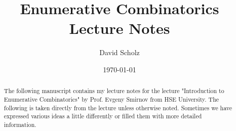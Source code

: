 \documentclass[a4paper,12pt,oneside]{article}
\title{Enumerative Combinatorics\\[0.3cm] \Large Lecture Notes}
\date{\today}
\author{David Scholz}
\theoremstyle{plain}
\theoremstyle{definition}
\theoremstyle{definition}
\begin{document}
\begin{titlingpage}
\maketitle
\end{titlingpage}

\newpage

\setcounter{page}{1} %

\thispagestyle{empty}
  
\newpage  
\pagestyle{empty}

\newpage

\begin{abstract}
    The following manuscript contains my lecture notes for the lecture "Introduction to Enumerative Combinatorics" by Prof. Evgeny Smirnov from HSE University. The following is taken directly 
    from the lecture unless otherwise noted. Sometimes we have expressed various ideas a little differently or filled them with more detailed information.
\end{abstract} 


\newpage
\pagestyle{empty}

\tableofcontents

\newpage
\pagestyle{fancy} 


\thispagestyle{empty}
\listoffigures

\newpage
\pagestyle{fancy}
















\newpage


\thispagestyle{empty}
    
\end{document}
